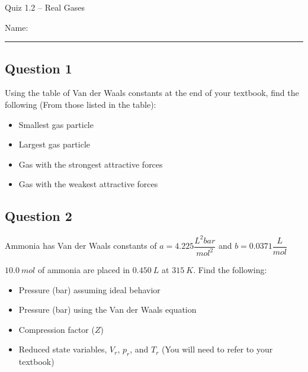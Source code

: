 \documentclass[11pt, letterpaper]{memoir}
\begin{document}
	\begin{center}
		{\large Quiz 1.2 --	Real Gases}
	\end{center}
	{\large Name: \rule[-1mm]{4in}{.1pt} 

\subsection*{Question 1}
Using the table of Van der Waals constants at the end of your textbook, find the following (From those listed in the table):
\begin{itemize}
	\item Smallest gas particle
	
	\vspace{1em}
	\item Largest gas particle
	
	\vspace{1em}
	\item Gas with the strongest attractive forces
	
	\vspace{1em}
	\item Gas with the weakest attractive forces
\end{itemize}

\vspace{1em}
\subsection*{Question 2}
Ammonia has Van der Waals constants of $a=4.225\dfrac{L^2bar}{mol^2}$ and $b=0.0371\dfrac{L}{mol}$

$10.0~mol$ of ammonia are placed in $0.450~L$ at $315~K$. Find the following:
\begin{itemize}
	\item Pressure (bar) assuming ideal behavior
	
	\vspace{3em}
	\item Pressure (bar) using the Van der Waals equation
	
	\vspace{4em}
	\item Compression factor ($Z$)
	
	\vspace{4em}
	\item Reduced state variables, $V_r$, $p_r$, and $T_r$ (You will need to refer to your textbook)
\end{itemize}

\vspace{6em}
}
\end{document}
